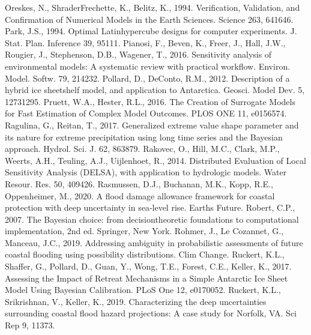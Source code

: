 \documentclass[letterpaper,10pt,english]{sphinxmanual}
\begin{document}
Oreskes, N., Shrader\sphinxhyphen{}Frechette, K., Belitz, K., 1994. Verification, Validation, and Confirmation of Numerical Models in the Earth Sciences. Science 263, 641\textendash{}646. 
Park, J.\sphinxhyphen{}S., 1994. Optimal Latin\sphinxhyphen{}hypercube designs for computer experiments. J. Stat. Plan. Inference 39, 95\textendash{}111. 
Pianosi, F., Beven, K., Freer, J., Hall, J.W., Rougier, J., Stephenson, D.B., Wagener, T., 2016. Sensitivity analysis of environmental models: A systematic review with practical workflow. Environ. Model. Softw. 79, 214\textendash{}232. 
Pollard, D., DeConto, R.M., 2012. Description of a hybrid ice sheet\sphinxhyphen{}shelf model, and application to Antarctica. Geosci. Model Dev. 5, 1273\textendash{}1295. 
Pruett, W.A., Hester, R.L., 2016. The Creation of Surrogate Models for Fast Estimation of Complex Model Outcomes. PLOS ONE 11, e0156574. 
Ragulina, G., Reitan, T., 2017. Generalized extreme value shape parameter and its nature for extreme precipitation using long time series and the Bayesian approach. Hydrol. Sci. J. 62, 863\textendash{}879.
Rakovec, O., Hill, M.C., Clark, M.P., Weerts, A.H., Teuling, A.J., Uijlenhoet, R., 2014. Distributed Evaluation of Local Sensitivity Analysis (DELSA), with application to hydrologic models. Water Resour. Res. 50, 409\textendash{}426. 
Rasmussen, D.J., Buchanan, M.K., Kopp, R.E., Oppenheimer, M., 2020. A flood damage allowance framework for coastal protection with deep uncertainty in sea‐level rise. Earths Future. 
Robert, C.P., 2007. The Bayesian choice: from decision\sphinxhyphen{}theoretic foundations to computational implementation, 2nd ed. Springer, New York.
Rohmer, J., Le Cozannet, G., Manceau, J.\sphinxhyphen{}C., 2019. Addressing ambiguity in probabilistic assessments of future coastal flooding using possibility distributions. Clim Change. 
Ruckert, K.L., Shaffer, G., Pollard, D., Guan, Y., Wong, T.E., Forest, C.E., Keller, K., 2017. Assessing the Impact of Retreat Mechanisms in a Simple Antarctic Ice Sheet Model Using Bayesian Calibration. PLoS One 12, e0170052. 
Ruckert, K.L., Srikrishnan, V., Keller, K., 2019. Characterizing the deep uncertainties surrounding coastal flood hazard projections: A case study for Norfolk, VA. Sci Rep 9, 11373. 
\end{document}
